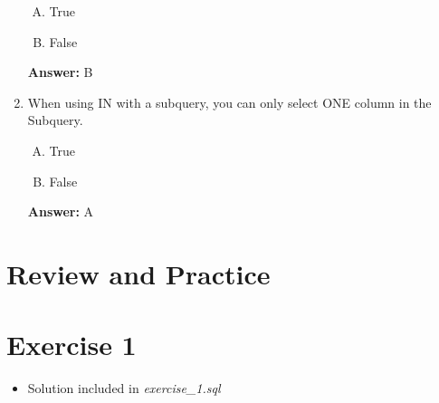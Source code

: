 \documentclass[12pt]{article}
\begin{document}
\begin{enumerate}[1.]
    \begin{enumerate}[A.]
        \item True
        \item False
    \end{enumerate}

    \bigskip

    \textbf{Answer:} B


    \item

    When using IN with a subquery, you can only select ONE column in the Subquery.

    \begin{enumerate}[A.]
        \item True
        \item False
    \end{enumerate}

    \bigskip

    \textbf{Answer:} A

\end{enumerate}

\bigskip

\section{Review and Practice}

\bigskip

\section{Exercise 1}

\bigskip

\begin{itemize}
    \item Solution included in \textit{exercise\_1.sql}
\end{itemize}
\end{document}
